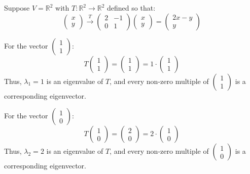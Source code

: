 \begin{example}
    Suppose $V = \mathbb{R}^2$ with $T: \mathbb{R}^2 \to \mathbb{R}^2$ defined so that:
    \[
    \begin{pmatrix} x \\ y \end{pmatrix} \xrightarrow{T} \begin{pmatrix} 2 & -1 \\ 0 & 1 \end{pmatrix} \begin{pmatrix} x \\ y \end{pmatrix} = \begin{pmatrix} 2x - y \\ y \end{pmatrix}
    \]
    
    For the vector $\begin{pmatrix} 1 \\ 1 \end{pmatrix}$:
    \[
    T \begin{pmatrix} 1 \\ 1 \end{pmatrix} = \begin{pmatrix} 1 \\ 1 \end{pmatrix} = 1 \cdot \begin{pmatrix} 1 \\ 1 \end{pmatrix}
    \]
    Thus, $\lambda_1 = 1$ is an eigenvalue of $T$, and every non-zero multiple of $\begin{pmatrix} 1 \\ 1 \end{pmatrix}$ is a corresponding eigenvector.
    \vspace{1em}

    For the vector $\begin{pmatrix} 1 \\ 0 \end{pmatrix}$:
    \[
    T \begin{pmatrix} 1 \\ 0 \end{pmatrix} = \begin{pmatrix} 2 \\ 0 \end{pmatrix} = 2 \cdot  \begin{pmatrix} 1 \\ 0 \end{pmatrix}
    \]
    Thus, $\lambda_2 = 2$ is an eigenvalue of $T$, and every non-zero multiple of $\begin{pmatrix} 1 \\ 0 \end{pmatrix}$ is a corresponding eigenvector.
    \vspace{1em}


\end{example}
